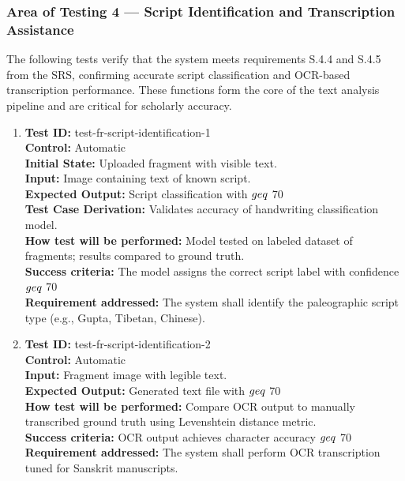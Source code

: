 \documentclass[12pt, titlepage]{article}
\begin{document}
\subsubsection{Area of Testing 4 — Script Identification and Transcription Assistance}

The following tests verify that the system meets requirements S.4.4 and S.4.5 from the SRS, confirming accurate script classification and OCR-based transcription performance. These functions form the core of the text analysis pipeline and are critical for scholarly accuracy.

\begin{enumerate}
    \item
    \textbf{Test ID:} test-fr-script-identification-1\\
    \textbf{Control:} Automatic\\
    \textbf{Initial State:} Uploaded fragment with visible text.\\
    \textbf{Input:} Image containing text of known script.\\
    \textbf{Expected Output:} Script classification with $\\geq$ 70\\%
    \textbf{Test Case Derivation:} Validates accuracy of handwriting classification model.\\
    \textbf{How test will be performed:} Model tested on labeled dataset of fragments; results compared to ground truth.\\
    \textbf{Success criteria:} The model assigns the correct script label with confidence $\\geq$ 70\\%
    \textbf{Requirement addressed:} The system shall identify the paleographic script type (e.g., Gupta, Tibetan, Chinese).\\

    \item
    \textbf{Test ID:} test-fr-script-identification-2\\
    \textbf{Control:} Automatic\\
    \textbf{Input:} Fragment image with legible text.\\
    \textbf{Expected Output:} Generated text file with $\\geq$ 70\\%
    \textbf{How test will be performed:} Compare OCR output to manually transcribed ground truth using Levenshtein distance metric.\\
    \textbf{Success criteria:} OCR output achieves character accuracy $\\geq$ 70\\%
    \textbf{Requirement addressed:} The system shall perform OCR transcription tuned for Sanskrit manuscripts.\\
\end{enumerate}
\end{document}
